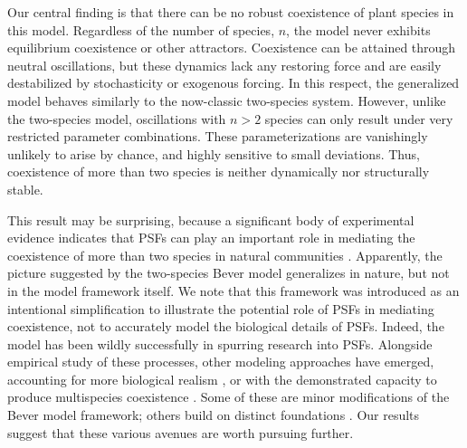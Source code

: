 \documentclass[11pt]{article}
\begin{document}
Our central finding is that there can be no robust coexistence of plant species in this model. Regardless of the number of species, $n$, the model never exhibits equilibrium coexistence or other attractors. Coexistence can be attained through neutral oscillations, but these dynamics lack any restoring force and are easily destabilized by stochasticity or exogenous forcing. In this respect, the generalized model behaves similarly to the now-classic two-species system. However, unlike the two-species model, oscillations with $n > 2$ species can only result under very restricted parameter combinations. These parameterizations are vanishingly unlikely to arise by chance, and highly sensitive to small deviations. Thus, coexistence of more than two species is neither dynamically nor structurally stable.

This result may be surprising, because a significant body of experimental evidence indicates that PSFs can play an important role in mediating the coexistence of more than two species in natural communities \citep{kulmatiski2008plant,petermann2008janzen,mangan2010negative,bever2015maintenance}. Apparently, the picture suggested by the two-species Bever model generalizes in nature, but not in the model framework itself. We note that this framework was introduced as an intentional simplification to illustrate the potential role of PSFs in mediating coexistence, not to accurately model the biological details of PSFs. Indeed, the model has been wildly successfully in spurring research into PSFs. Alongside empirical study of these processes, other modeling approaches have emerged, accounting for more biological realism \citep[e.g.,][]{umbanhowar2005simple,eppstein2007invasiveness,bever2010rooting}, or with the demonstrated capacity to produce multispecies coexistence  \citep[e.g.,][]{bonanomi2005negative,miller2021metapopulations}. Some of these are minor modifications of the Bever model framework; others build on distinct foundations \citep{ke2015incorporating,ke2020effects}. Our results suggest that these various avenues are worth pursuing further.
\end{document}
